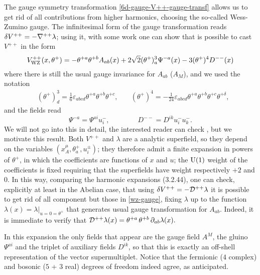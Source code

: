 The gauge symmetry transformation \eqref{6d-gauge-V++-gauge-transf} allows us to get rid of all contributions from higher harmonics, choosing the so-called Wess-Zumino gauge. The infinitesimal form of the gauge transformation reads \( \delta V^{++} = - { \mathcal{\nabla} }^{++} \lambda \); using it, with some work one can show that is possible to cast $V^{++}$ in the form
\begin{equation}\label{wz-gauge}
V^{++}_{{ \text{WZ} }}(x,\theta^+)
	=
- \theta^{ + a } \theta^{ + b } A_{a b }(x) 
+ 2 \sqrt{2} (\theta^+)^3_a \Psi^{ - a}(x)
- 3 (\theta^+)^4 D^{--}(x)
\end{equation}
where there is still the usual gauge invariance for $A_{ab}$ (\ie $A_M$), and we used the notation
\begin{align}
&\left(
	\theta^+
\right)^3_d
	=
\frac{1}{6} \varepsilon_{a b c d} 
\theta^{ + a } \theta^{ + b } \theta^{ + c },
\quad
&\left(
	\theta^+
\right)^4
	=
- \frac{1}{24} \varepsilon_{a b c d} \theta^{ + a } \theta^{ + b } \theta^{ + c } \theta^{ + \delta },
\end{align}
and the fields read
\begin{equation}
\Psi^{-a} = \Psi^{ai} u^-_i,
%
\qquad\qquad
%
D^{--} = D^{ik}u^-_i u^-_k.
\end{equation}
We will not go into this in detail, the interested reader can check \cite{Galperin:book}, but we motivate this result. Both $V^{++}$ and $\lambda$ are a analytic superfield, so they depend on the variables $(x_A^\mu, \theta^+_a, u^\pm_i)$; they therefore admit a finite expansion in powers of $\theta^+$, in which the coefficients are functions of $x$ and $u$; the ${ \text{U} }(1)$ weight of the coefficients is fixed requiring that the superfields have weight respectively $+2$ and $0$. In this way, comparing the harmonic expansions (3.2.44), one can check, explicitly at least in the Abelian case, that using $\delta V^{++} = - { \mathcal{D} }^{++} \lambda $ it is possible to get rid of all component but those in \eqref{wz-gauge}, fixing $\lambda$ up to the function $\lambda(x) = \lambda |_{u=0=\theta^+}$ that generates usual gauge transformation for $A_{ab}$. Indeed, it is immediate to verify that ${ \mathcal{D} }^{++} \lambda(x) = \theta^{+a} \, \theta^{+b} \, \partial_{ab} \lambda (x).$



In this expansion the only fields that appear are the gauge field $A^M$, the gluino $\Psi^{ai}$ and the triplet of auxiliary fields $D^{ik}$, so that this is exactly an off-shell representation of the vector supermultiplet. Notice that the fermionic ($4$ complex) and bosonic ($5$ + $3$ real) degrees of freedom indeed agree, as anticipated.


